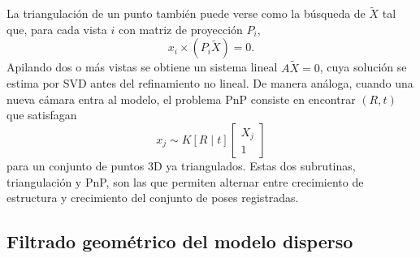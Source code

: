 \documentclass[conference]{IEEEtran}
\begin{document}
La triangulaci\'on de un punto tambi\'en puede verse como la b\'usqueda de \(\tilde{X}\) tal que, para cada vista \(i\) con matriz de proyecci\'on \(P_i\),
\begin{equation}
x_i \times (P_i \tilde{X}) = 0.
\end{equation}
Apilando dos o m\'as vistas se obtiene un sistema lineal \(A\tilde{X}=0\), cuya soluci\'on se estima por SVD antes del refinamiento no lineal. De manera an\'aloga, cuando una nueva c\'amara entra al modelo, el problema PnP consiste en encontrar \((R,t)\) que satisfagan
\begin{equation}
x_j \sim K [R \mid t]
\begin{bmatrix}
X_j \\ 1
\end{bmatrix}
\end{equation}
para un conjunto de puntos 3D ya triangulados. Estas dos subrutinas, triangulaci\'on y PnP, son las que permiten alternar entre crecimiento de estructura y crecimiento del conjunto de poses registradas.

\subsection{Filtrado geom\'etrico del modelo disperso}
\end{document}
